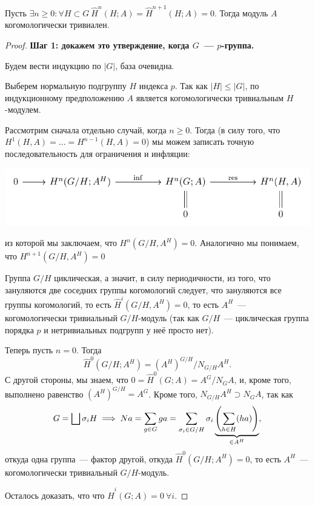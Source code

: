 	\begin{statement}\label{cohomology_trivial_criterion} 
		Пусть $\exists n \ge 0 \colon \forall H \subset G \ \widehat{H}^n(H; A) = \widehat{H}^{n + 1}(H; A) = 0$. Тогда модуль $A$ когомологически тривиален. 
	\end{statement}
	\begin{proof}
		\bf{Шаг 1:} докажем это утверждение, когда $G$~--- $p$-группа.

		 Будем вести индукцию по $|G|$, база очевидна. 

		 Выберем нормальную подгруппу $H$ индекса $p$. Так как $|H| \le |G|$, по индукционному предположению $A$ является когомологически тривиальным $H$-модулем. 

		 Рассмотрим сначала отдельно случай, когда $n \ge 0$. Тогда (в силу того, что $H^1(H, A) = \ldots = H^{n - 1}(H, A) = 0$) мы можем записать точную последовательность для ограничения и инфляции: 
		\begin{center}
			\includegraphics{lectures/6/pictures/cd_34.pdf}
		\end{center}
		из которой мы заключаем, что $H^n(G/H, A^H) = 0$. Аналогично мы понимаем, что $H^{n + 1}(G/H, A^H) = 0$

		 Группа $G/H$ циклическая, а значит, в силу периодичности, из того, что зануляются две соседних группы когомологий следует, что зануляются все группы когомологий, то есть $\widehat{H}^i(G/H, A^H) = 0$, то есть $A^H$~--- когомологически тривиальный $G/H$-модуль (так как $G/H$~--- циклическая группа порядка $p$ и нетривиальных подгрупп у неё просто нет).  
		
		Теперь пусть $n = 0$. Тогда 
		\[
			\widehat{H}^0(G/H; A^H) = (A^H)^{G/H}/N_{G/H}A^H.
		\]
		С другой стороны, мы знаем, что $0 = \widehat{H}^0(G; A) = A^G/N_G A$, и, кроме того, выполнено равенство $(A^H)^{G/H} = A^G$. Кроме того, $N_{G/H}A^H \supset N_G A$, так как 
		\[
			G = \bigsqcup \sigma_i H \implies Na = \sum_{g \in G} g a = \sum_{\sigma_i \in G/H} \sigma_i \underbrace{\lr*{\sum_{h \in H} (ha)}}_{\in A^H},
		\]
		откуда одна группа~--- фактор другой, откуда $\widehat{H}^0(G/H; A^H) = 0$, то есть $A^H$~--- когомологически тривиальный $G/H$-модуль. 

		Осталось доказать, что что $\widehat{H}^i(G; A) = 0 \ \forall i$. 


\end{proof}
